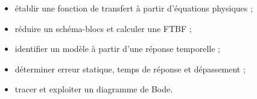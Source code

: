 \begin{savoirfaire}
\begin{itemize}
  \item établir une fonction de transfert à partir d'équations physiques ;
  \item réduire un schéma-blocs et calculer une FTBF ;
  \item identifier un modèle à partir d'une réponse temporelle ;
  \item déterminer erreur statique, temps de réponse et dépassement ;
  \item tracer et exploiter un diagramme de Bode.
\end{itemize}
\end{savoirfaire}






